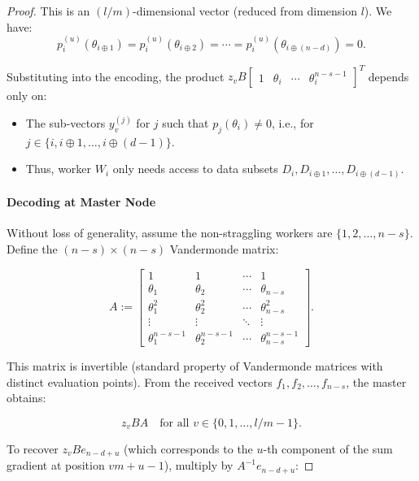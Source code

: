\documentclass{report}
\theoremstyle{definition}
\begin{document}
\begin{proof}
    \noindent This is an $(l/m)$-dimensional vector (reduced from dimension $l$). We have:
    $$p_i^{(u)}(\theta_{i \oplus 1}) = p_i^{(u)}(\theta_{i \oplus 2}) = \cdots = p_i^{(u)}(\theta_{i \oplus (n-d)}) = 0.$$

    Substituting into the encoding, the product $z_v B \begin{bmatrix} 1 & \theta_i & \cdots & \theta_i^{n-s-1} \end{bmatrix}^T$ depends only on:
    \begin{itemize}
        \item The sub-vectors $y_v^{(j)}$ for $j$ such that $p_j(\theta_i) \neq 0$, i.e., for $j \in \{i, i \oplus 1, \ldots, i \oplus (d-1)\}$.
        \item Thus, worker $W_i$ only needs access to data subsets $D_i, D_{i \oplus 1}, \ldots, D_{i \oplus (d-1)}$.
    \end{itemize}

    \paragraph{Decoding at Master Node}
     Without loss of generality, assume the non-straggling workers are $\{1, 2, \ldots, n-s\}$. Define the $(n-s) \times (n-s)$ Vandermonde matrix:

    \begin{equation}
    A := 
    \begin{bmatrix}
    1 & 1 & \cdots & 1 \\
    \theta_1 & \theta_2 & \cdots & \theta_{n-s} \\
    \theta_1^2 & \theta_2^2 & \cdots & \theta_{n-s}^2 \\
    \vdots & \vdots & \ddots & \vdots \\
    \theta_1^{n-s-1} & \theta_2^{n-s-1} & \cdots & \theta_{n-s}^{n-s-1}
    \end{bmatrix}.
    \end{equation}

    \noindent This matrix is invertible (standard property of Vandermonde matrices with distinct evaluation points). From the received vectors $f_1, f_2, \ldots, f_{n-s}$, the master obtains:

    \begin{equation}
    z_v B A \quad \text{for all } v \in \{0, 1, \ldots, l/m - 1\}.
    \end{equation}

    \noindent To recover $z_v B e_{n-d+u}$ (which corresponds to the $u$-th component of the sum gradient at position $vm + u - 1$), multiply by $A^{-1} e_{n-d+u}$:


\end{proof}
\end{document}
